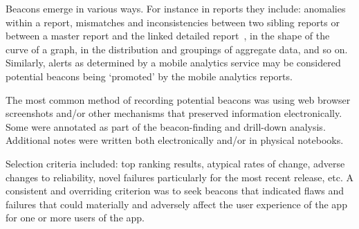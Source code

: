 Beacons emerge in various ways. For instance in reports they include: anomalies within a report, mismatches and inconsistencies between two sibling reports or between a master report and the linked detailed report~, in the shape of the curve of a graph, in the distribution and groupings of aggregate data, and so on. Similarly, alerts as determined by a mobile analytics service may be considered potential beacons being `promoted' by the mobile analytics reports. 

The most common method of recording potential beacons was using web browser screenshots and/or other mechanisms that preserved information electronically. Some were annotated as part of the beacon-finding and drill-down analysis. Additional notes were written both electronically and/or in physical notebooks. 

Selection criteria included: top ranking results, atypical rates of change, adverse changes to reliability, novel failures particularly for the most recent release, etc. A consistent and overriding criterion was to seek beacons that indicated flaws and failures that could materially and adversely affect the user experience of the app for one or more users of the app.


 




